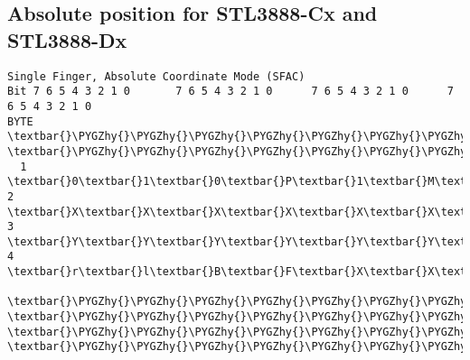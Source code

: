 \documentclass[a4paper,8pt,english]{sphinxmanual}
\def\PYGZhy{\char`\-}
\begin{document}
\subsection{Absolute position for STL3888-Cx and STL3888-Dx}
\label{input/devices/sentelic:absolute-position-for-stl3888-cx-and-stl3888-dx}
\begin{Verbatim}[commandchars=\\\{\}]
Single Finger, Absolute Coordinate Mode (SFAC)
Bit 7 6 5 4 3 2 1 0       7 6 5 4 3 2 1 0      7 6 5 4 3 2 1 0      7 6 5 4 3 2 1 0
BYTE  \textbar{}\PYGZhy{}\PYGZhy{}\PYGZhy{}\PYGZhy{}\PYGZhy{}\PYGZhy{}\PYGZhy{}\PYGZhy{}\PYGZhy{}\PYGZhy{}\PYGZhy{}\PYGZhy{}\PYGZhy{}\PYGZhy{}\PYGZhy{}\textbar{}BYTE \textbar{}\PYGZhy{}\PYGZhy{}\PYGZhy{}\PYGZhy{}\PYGZhy{}\PYGZhy{}\PYGZhy{}\PYGZhy{}\PYGZhy{}\PYGZhy{}\PYGZhy{}\PYGZhy{}\PYGZhy{}\PYGZhy{}\PYGZhy{}\textbar{}BYTE\textbar{}\PYGZhy{}\PYGZhy{}\PYGZhy{}\PYGZhy{}\PYGZhy{}\PYGZhy{}\PYGZhy{}\PYGZhy{}\PYGZhy{}\PYGZhy{}\PYGZhy{}\PYGZhy{}\PYGZhy{}\PYGZhy{}\PYGZhy{}\textbar{}BYTE\textbar{}\PYGZhy{}\PYGZhy{}\PYGZhy{}\PYGZhy{}\PYGZhy{}\PYGZhy{}\PYGZhy{}\PYGZhy{}\PYGZhy{}\PYGZhy{}\PYGZhy{}\PYGZhy{}\PYGZhy{}\PYGZhy{}\PYGZhy{}\textbar{}
  1   \textbar{}0\textbar{}1\textbar{}0\textbar{}P\textbar{}1\textbar{}M\textbar{}R\textbar{}L\textbar{}  2  \textbar{}X\textbar{}X\textbar{}X\textbar{}X\textbar{}X\textbar{}X\textbar{}X\textbar{}X\textbar{}  3 \textbar{}Y\textbar{}Y\textbar{}Y\textbar{}Y\textbar{}Y\textbar{}Y\textbar{}Y\textbar{}Y\textbar{}  4 \textbar{}r\textbar{}l\textbar{}B\textbar{}F\textbar{}X\textbar{}X\textbar{}Y\textbar{}Y\textbar{}
      \textbar{}\PYGZhy{}\PYGZhy{}\PYGZhy{}\PYGZhy{}\PYGZhy{}\PYGZhy{}\PYGZhy{}\PYGZhy{}\PYGZhy{}\PYGZhy{}\PYGZhy{}\PYGZhy{}\PYGZhy{}\PYGZhy{}\PYGZhy{}\textbar{}     \textbar{}\PYGZhy{}\PYGZhy{}\PYGZhy{}\PYGZhy{}\PYGZhy{}\PYGZhy{}\PYGZhy{}\PYGZhy{}\PYGZhy{}\PYGZhy{}\PYGZhy{}\PYGZhy{}\PYGZhy{}\PYGZhy{}\PYGZhy{}\textbar{}    \textbar{}\PYGZhy{}\PYGZhy{}\PYGZhy{}\PYGZhy{}\PYGZhy{}\PYGZhy{}\PYGZhy{}\PYGZhy{}\PYGZhy{}\PYGZhy{}\PYGZhy{}\PYGZhy{}\PYGZhy{}\PYGZhy{}\PYGZhy{}\textbar{}    \textbar{}\PYGZhy{}\PYGZhy{}\PYGZhy{}\PYGZhy{}\PYGZhy{}\PYGZhy{}\PYGZhy{}\PYGZhy{}\PYGZhy{}\PYGZhy{}\PYGZhy{}\PYGZhy{}\PYGZhy{}\PYGZhy{}\PYGZhy{}\textbar{}


\end{Verbatim}
\end{document}
